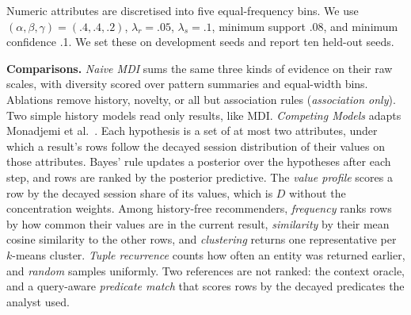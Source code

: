 \documentclass[sigconf]{acmart}
\begin{document}
Numeric attributes are discretised into five equal-frequency bins. We use $(\alpha,\beta,\gamma)=(.4,.4,.2)$, $\lambda_r=.05$, $\lambda_s=.1$, minimum support .08, and minimum confidence .1. We set these on development seeds and report ten held-out seeds.

\textbf{Comparisons.}
\emph{Naive MDI} sums the same three kinds of evidence on their raw scales, with diversity scored over pattern summaries and equal-width bins. Ablations remove history, novelty, or all but association rules (\emph{association only}). Two simple history models read only results, like MDI. \emph{Competing Models} adapts Monadjemi et al.~\cite{monadjemi2021competing}. Each hypothesis is a set of at most two attributes, under which a result's rows follow the decayed session distribution of their values on those attributes. Bayes' rule updates a posterior over the hypotheses after each step, and rows are ranked by the posterior predictive. The \emph{value profile} scores a row by the decayed session share of its values, which is $D$ without the concentration weights. Among history-free recommenders, \emph{frequency} ranks rows by how common their values are in the current result, \emph{similarity} by their mean cosine similarity to the other rows, and \emph{clustering} returns one representative per $k$-means cluster. \emph{Tuple recurrence} counts how often an entity was returned earlier, and \emph{random} samples uniformly. Two references are not ranked: the context oracle, and a query-aware \emph{predicate match} that scores rows by the decayed predicates the analyst used.

\begin{table}[t]
\caption{Precision@10 after eight steps on held-out seeds (random .15; 95\% CI half-widths ${\le}.09$). Amb: ambiguous; Det: detour; Sw: after a switch. Best result-only method per column in bold. $^{*}$Query-aware reference: reads the analyst's queries, not only results, so it is not ranked.}
\label{tab:results}
\small
\setlength{\tabcolsep}{2.6pt}

\end{table}

\begin{table}[t]
\caption{Clear trajectories (held-out seeds): Precision@10 after eight steps for structural, distributional, compositional, and shared-context destinations. Rec.: share of kind-seed pairs reaching pattern-level earliness; Lag: mean steps after the distinguishing step, over recovered pairs. Bold: within the 95\% interval of the best ranked value. $^{\dagger}$Told the active context. $^{*}$Query-aware.}
\label{tab:baselines}
\small

\end{table}
\end{document}
